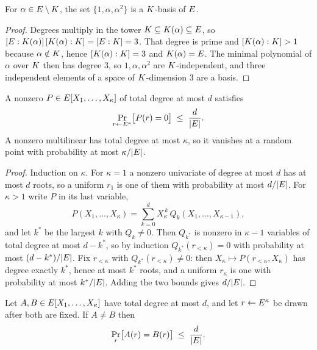 \begin{lemma}\label{lem:kbasis}
For $\alpha\in E\setminus K$, the set $\{1,\alpha,\alpha^{2}\}$ is a $K$-basis of $E$.
\end{lemma}

\begin{proof}
Degrees multiply in the tower $K\subseteq K(\alpha)\subseteq E$, so $[E:K(\alpha)]\,[K(\alpha):K]=[E:K]=3$. That degree is prime and $[K(\alpha):K]>1$ because $\alpha\notin K$, hence $[K(\alpha):K]=3$ and $K(\alpha)=E$. The minimal polynomial of $\alpha$ over $K$ then has degree $3$, so $1,\alpha,\alpha^{2}$ are $K$-independent, and three independent elements of a space of $K$-dimension $3$ are a basis.
\end{proof}

\begin{lemma}\label{lem:sz}
A nonzero $P\in E[X_1,\dots,X_{\kappa}]$ of total degree at most $d$ satisfies
\[
  \Pr_{r\leftarrow E^{\kappa}}\bigl[P(r)=0\bigr]\;\le\;\frac{d}{|E|}.
\]
A nonzero multilinear has total degree at most $\kappa$, so it vanishes at a random point with probability at most $\kappa/|E|$.
\end{lemma}

\begin{proof}
Induction on $\kappa$. For $\kappa=1$ a nonzero univariate of degree at most $d$ has at most $d$ roots, so a uniform $r_1$ is one of them with probability at most $d/|E|$. For $\kappa>1$ write $P$ in its last variable,
\[
  P(X_1,\dots,X_{\kappa})=\sum_{k=0}^{d}X_{\kappa}^{\,k}\,Q_k(X_1,\dots,X_{\kappa-1}),
\]
and let $k^{\ast}$ be the largest $k$ with $Q_k\neq0$. Then $Q_{k^{\ast}}$ is nonzero in $\kappa-1$ variables of total degree at most $d-k^{\ast}$, so by induction $Q_{k^{\ast}}(r_{<\kappa})=0$ with probability at most $(d-k^{\ast})/|E|$. Fix $r_{<\kappa}$ with $Q_{k^{\ast}}(r_{<\kappa})\neq0$: then $X_{\kappa}\mapsto P(r_{<\kappa},X_{\kappa})$ has degree exactly $k^{\ast}$, hence at most $k^{\ast}$ roots, and a uniform $r_{\kappa}$ is one with probability at most $k^{\ast}/|E|$. Adding the two bounds gives $d/|E|$.
\end{proof}

\begin{corollary}\label{cor:idtest}
Let $A,B\in E[X_1,\dots,X_{\kappa}]$ have total degree at most $d$, and let $r\leftarrow E^{\kappa}$ be drawn after both are fixed. If $A\neq B$ then
\[
  \Pr_{r}\bigl[A(r)=B(r)\bigr]\;\le\;\frac{d}{|E|}.
\]
\end{corollary}

